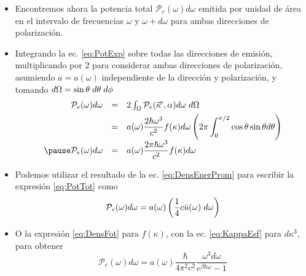 \documentclass{sintefbeamer}
\begin{document}
\begin{frame}
    \begin{itemize}
        \item Encontremos ahora la potencia total $\mathcal{P}_e(\omega)d\omega$ emitida por unidad de área en el intervalo de frecuencias $\omega$ y $\omega+d\omega$ para ambas direcciones de polarización.\pause
        \item Integrando la ec. \ref{eq:PotExp} sobre todas las direcciones de emisión, multiplicando por 2 para considerar ambas direcciones de polarización, asumiendo $a = a(\omega)$ independiente de la dirección y polarización, y tomando $d\Omega = \sin{\theta} \hspace{1mm} d\theta \hspace{1mm} d\phi$\pause
        \begin{equation}
            \begin{array}{rcl}
                \mathcal{P}_e(\omega)d\omega &=& 2\int_\Omega \mathcal{P}_e(\kv',\alpha) d\omega\hspace{1mm}d\Omega \\[1ex]
                &=& a(\omega)\dfrac{2\hbar\omega^3}{c^2}f(\kappa)d\omega\left(2\pi\displaystyle\int_0^{\pi/2}\cos{\theta}\sin{\theta}d\theta\right) \\[1ex]\pause
                \mathcal{P}_e(\omega)d\omega &=& a(\omega)\dfrac{2\pi\hbar\omega^3}{c^2}f(\kappa)d\omega
            \end{array}
            \label{eq:PotTot}
        \end{equation}
    \end{itemize}
\end{frame}

\begin{frame}
    \begin{itemize}
        \item Podemos utilizar el resultado de la ec. \ref{eq:DensEnerProm} para escribir la expresión \ref{eq:PotTot} como
        \begin{equation}
            \mathcal{P}_e(\omega)d\omega = a(\omega)\left(\frac{1}{4}c\bar{u}(\omega)\hspace{1mm}d\omega\right)
        \end{equation}\pause
        \item O la expresión \ref{eq:DensFot} para $f(\kappa)$, con la ec. \ref{eq:KappaEsf} para $d\kappa^3$, para obtener
        \begin{equation}
            \mathcal{P}_e(\omega)d\omega = a(\omega)\frac{\hbar}{4\pi^2c^2}\frac{\omega^3d\omega}{e^{\beta\hbar\omega}-1}
        \end{equation}
    \end{itemize}
\end{frame}
\end{document}
